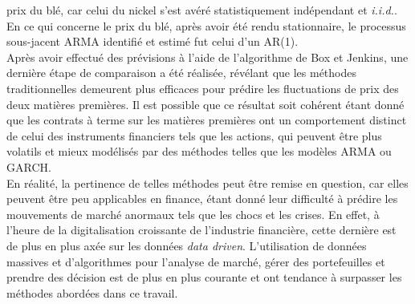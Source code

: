 prix du blé, car celui du nickel s'est avéré statistiquement indépendant et \textit{i.i.d.}. En ce qui concerne le prix du blé, après avoir été rendu stationnaire, le 
processus sous-jacent ARMA identifié et estimé fut celui d'un AR(1). \\[5pt]
Après avoir effectué des prévisions à l'aide de l'algorithme de Box et Jenkins, une dernière étape de comparaison a été réalisée, révélant que les méthodes traditionnelles 
demeurent plus efficaces pour prédire les fluctuations de prix des deux matières premières. Il est possible que ce résultat soit cohérent étant donné que les contrats à 
terme sur les matières premières ont un comportement distinct de celui des instruments financiers tels que les actions, qui peuvent être plus volatils et mieux modélisés 
par des méthodes telles que les modèles ARMA ou GARCH.\\[5pt]
En réalité, la pertinence de telles méthodes peut être remise en question, car elles peuvent être peu applicables en finance, étant donné leur difficulté à prédire les mouvements de marché anormaux tels que les chocs et les crises. En effet, à l'heure de la digitalisation croissante de l'industrie financière, cette dernière est de plus en plus axée sur les données \textit{data driven}. L'utilisation de données massives et d'algorithmes pour l'analyse de marché, gérer des portefeuilles et prendre des décision est de plus en plus courante et ont tendance à surpasser les méthodes abordées dans ce travail.